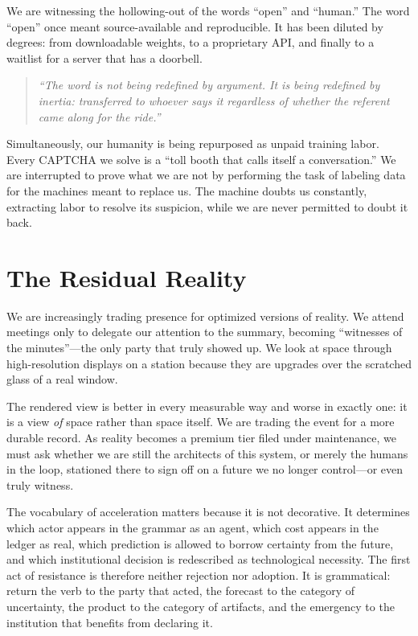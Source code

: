 \documentclass[11pt]{article}
\newenvironment{signalquote}
  {\begin{quote}\itshape\color{accent}}
  {\end{quote}}
\begin{document}
We are witnessing the hollowing-out of the words \enquote{open} and \enquote{human.} The word \enquote{open} once meant source-available and reproducible. It has been diluted by degrees: from downloadable weights, to a proprietary API, and finally to a waitlist for a server that has a doorbell.

\begin{signalquote}
\enquote{The word is not being redefined by argument. It is being redefined by inertia: transferred to whoever says it regardless of whether the referent came along for the ride.}
\end{signalquote}

Simultaneously, our humanity is being repurposed as unpaid training labor. Every CAPTCHA we solve is a \enquote{toll booth that calls itself a conversation.} We are interrupted to prove what we are not by performing the task of labeling data for the machines meant to replace us. The machine doubts us constantly, extracting labor to resolve its suspicion, while we are never permitted to doubt it back.

\section{The Residual Reality}

We are increasingly trading presence for optimized versions of reality. We attend meetings only to delegate our attention to the summary, becoming \enquote{witnesses of the minutes}---the only party that truly showed up. We look at space through high-resolution displays on a station because they are upgrades over the scratched glass of a real window.

The rendered view is better in every measurable way and worse in exactly one: it is a view \emph{of} space rather than space itself. We are trading the event for a more durable record. As reality becomes a premium tier filed under maintenance, we must ask whether we are still the architects of this system, or merely the humans in the loop, stationed there to sign off on a future we no longer control---or even truly witness.

The vocabulary of acceleration matters because it is not decorative. It determines which actor appears in the grammar as an agent, which cost appears in the ledger as real, which prediction is allowed to borrow certainty from the future, and which institutional decision is redescribed as technological necessity. The first act of resistance is therefore neither rejection nor adoption. It is grammatical: return the verb to the party that acted, the forecast to the category of uncertainty, the product to the category of artifacts, and the emergency to the institution that benefits from declaring it.
\end{document}
